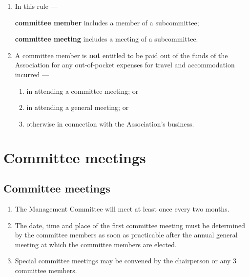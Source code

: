 \documentclass[../constitution.tex]{subfiles}
\begin{document}
\begin{enumerate}

\item In this rule ---

\textbf{committee member} includes a member of a subcommittee;

\textbf{committee meeting} includes a meeting of a subcommittee.

\item A committee member is \textbf{not} entitled to be paid out of the funds of the Association for any out-of-pocket expenses for travel and accommodation incurred ---

  \begin{enumerate}
  
  \item in attending a committee meeting; or
  \item in attending a general meeting; or
  \item otherwise in connection with the Association's business.
  \end{enumerate}
\end{enumerate}

\hypertarget{division-4-committee-meetings}{%
\section{Committee meetings}\label{division-4-committee-meetings}}

\hypertarget{committee-meetings}{%
\subsection{Committee meetings}\label{committee-meetings}}

\begin{enumerate}

\item The Management Committee will meet at least once every two months. 
\item The date, time and place of the first committee meeting must be determined by the committee members as soon as practicable after the annual general meeting at which the committee members are elected. 
\item Special committee meetings may be convened by the chairperson or any 3 committee members.
\end{enumerate}
\end{document}
